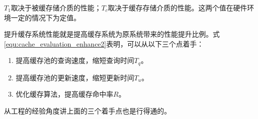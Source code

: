 $T_1$取决于被缓存储介质的性能；$T_c$取决于缓存存储介质的性能。这两个值在硬件环境一定的情况下为定值。

提升缓存系统性能就是提高缓存系统为原系统带来的性能提升比例。式\ref{equ:cache_evaluation_enhance2}表明，可以从以下三个点着手：

\begin{enumerate}
\item
提高缓存池的查询速度，缩短查询时间$T_q$。
\item
提高缓存池的更新速度，缩短更新时间$T_u$。
\item
优化缓存算法，提高缓存命中率$R$。
\end{enumerate}

从工程的经验角度讲上面的三个着手点也是行得通的。

